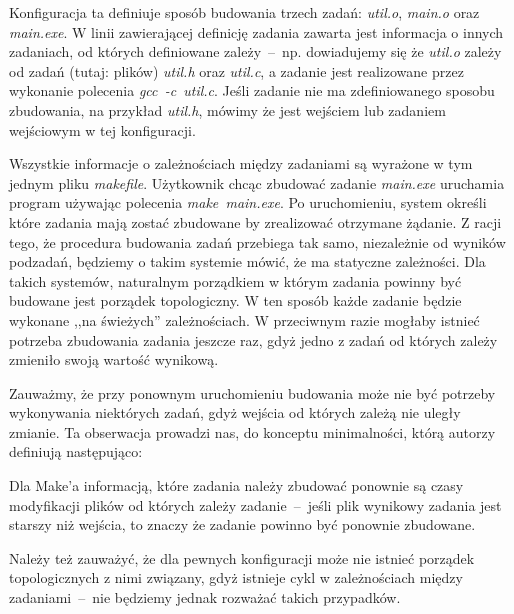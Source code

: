 Konfiguracja ta definiuje sposób budowania trzech zadań: \textit{util.o}, \textit{main.o} oraz \textit{main.exe}. W linii zawierającej definicję zadania zawarta jest informacja o innych zadaniach, od których definiowane zależy~--~np. dowiadujemy się że \textit{util.o} zależy od zadań (tutaj: plików) \textit{util.h} oraz \textit{util.c}, a zadanie jest realizowane przez wykonanie polecenia \textit{gcc~\nobreakdash-c~util.c}. Jeśli zadanie nie ma zdefiniowanego sposobu zbudowania, na przykład \textit{util.h}, mówimy że jest wejściem lub zadaniem wejściowym w tej konfiguracji.

Wszystkie informacje o zależnościach między zadaniami są wyrażone w tym jednym pliku \textit{makefile}. Użytkownik chcąc zbudować zadanie \textit{main.exe} uruchamia program używając polecenia \textit{make~main.exe}. Po uruchomieniu, system określi które zadania mają zostać zbudowane by zrealizować otrzymane żądanie. Z racji tego, że procedura budowania zadań przebiega tak samo, niezależnie od wyników podzadań, będziemy o takim systemie mówić, że ma statyczne zależności. Dla takich systemów, naturalnym porządkiem w którym zadania powinny być budowane jest porządek topologiczny. W ten sposób każde zadanie będzie wykonane ,,na świeżych'' zależnościach. W przeciwnym razie mogłaby istnieć potrzeba zbudowania zadania jeszcze raz, gdyż jedno z zadań od których zależy zmieniło swoją wartość wynikową.

Zauważmy, że przy ponownym uruchomieniu budowania może nie być potrzeby wykonywania niektórych zadań, gdyż wejścia od których zależą nie uległy zmianie. Ta obserwacja prowadzi nas, do konceptu minimalności, którą autorzy definiują następująco:


Dla Make'a informacją, które zadania należy zbudować ponownie są czasy modyfikacji plików od których zależy zadanie~--~jeśli plik wynikowy zadania jest starszy niż wejścia, to znaczy że zadanie powinno być ponownie zbudowane.

Należy też zauważyć, że dla pewnych konfiguracji może nie istnieć porządek topologicznych z nimi związany, gdyż istnieje cykl w zależnościach między zadaniami~--~nie będziemy jednak rozważać takich przypadków.

